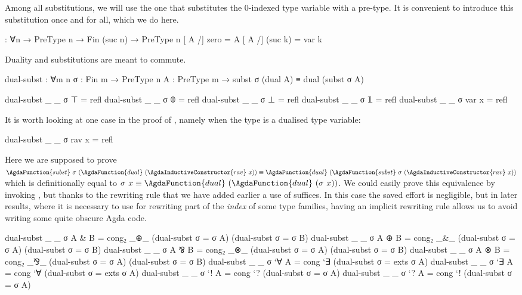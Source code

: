 Among all substitutions, we will use the one that substitutes the 0-indexed type
variable with a pre-type. It is convenient to introduce this substitution once
and for all, which we do here.

\begin{code}
[_/] : ∀{n} → PreType n → Fin (suc n) → PreType n
[ A /] zero     = A
[ A /] (suc k)  = var k
\end{code}

Duality and substitutions are meant to commute.

\begin{code}
dual-subst : ∀{m n} {σ : Fin m → PreType n} {A : PreType m} →
             subst σ (dual A) ≡ dual (subst σ A)
\end{code}
\begin{code}[hide]
dual-subst {_} {_} {σ} {⊤} = refl
dual-subst {_} {_} {σ} {𝟘} = refl
dual-subst {_} {_} {σ} {⊥} = refl
dual-subst {_} {_} {σ} {𝟙} = refl
dual-subst {_} {_} {σ} {var x} = refl
\end{code}

It is worth looking at one case in the proof of ,
namely when the type is a dualised type variable:

\begin{code}
dual-subst {_} {_} {σ} {rav x} = refl
\end{code}

Here we are supposed to prove
$\AgdaFunction{subst}~\sigma~(\AgdaFunction{dual}~(\AgdaInductiveConstructor{rav}~x))
  \equiv
  \AgdaFunction{dual}~(\AgdaFunction{subst}~\sigma~(\AgdaInductiveConstructor{rav}~x))$
  which is definitionally equal to $\sigma~x \equiv
  \AgdaFunction{dual}~(\AgdaFunction{dual}~(\sigma~x))$.
%
We could easily prove this equivalence by invoking , but
thanks to the rewriting rule that we have added earlier a use of
 suffices. In this case the saved effort is
negligible, but in later results, where it is necessary to use
 for rewriting part of the \emph{index} of some type
families, having an implicit rewriting rule allows us to avoid writing some
quite obscure Agda code.

\begin{code}[hide]
dual-subst {_} {_} {σ} {A & B} = cong₂ _⊕_ (dual-subst {σ = σ} {A}) (dual-subst {σ = σ} {B})
dual-subst {_} {_} {σ} {A ⊕ B} = cong₂ _&_ (dual-subst {σ = σ} {A}) (dual-subst {σ = σ} {B})
dual-subst {_} {_} {σ} {A ⅋ B} = cong₂ _⊗_ (dual-subst {σ = σ} {A}) (dual-subst {σ = σ} {B})
dual-subst {_} {_} {σ} {A ⊗ B} = cong₂ _⅋_ (dual-subst {σ = σ} {A}) (dual-subst {σ = σ} {B})
dual-subst {_} {_} {σ} {`∀ A} = cong `∃ (dual-subst {σ = exts σ} {A})
dual-subst {_} {_} {σ} {`∃ A} = cong `∀ (dual-subst {σ = exts σ} {A})
dual-subst {_} {_} {σ} {`! A} = cong `? (dual-subst {σ = σ} {A})
dual-subst {_} {_} {σ} {`? A} = cong `! (dual-subst {σ = σ} {A})
\end{code}

